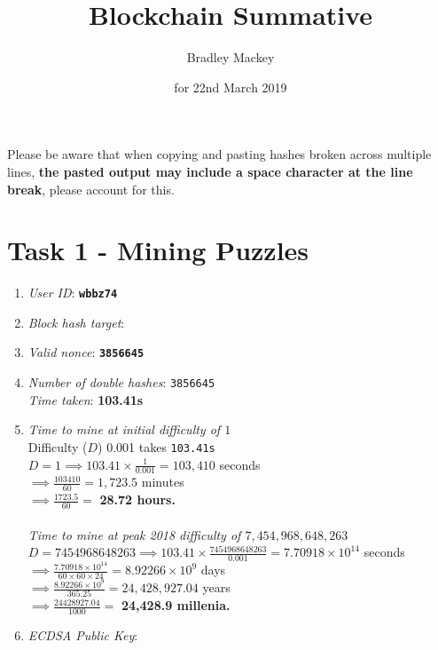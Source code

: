 \documentclass[11pt]{article}
\begin{document}
\title{\textbf{Blockchain Summative}}
\date{for 22nd March 2019}
\author{Bradley Mackey}
\maketitle

Please be aware that when copying and pasting hashes broken across multiple lines, \textbf{the pasted output may include a space character at the line break}, please account for this.


\section*{Task 1 - Mining Puzzles}

\begin{enumerate}
\item \textit{User ID}: \textbf{\texttt{wbbz74}}
\item \textit{Block hash target}: \texttt{}
\item \textit{Valid nonce}: \textbf{\texttt{3856645}}
\item \textit{Number of double hashes}: \texttt{3856645}\\\textit{Time taken}: \textbf{103.41s}
\item 
\textit{Time to mine at initial difficulty of $1$}\\
Difficulty ($D$) 0.001 takes \texttt{103.41s}\\
$D=1 \implies 103.41\times{\frac{1}{0.001}}=103,410$ seconds\\
$\implies \frac{103410}{60}=1,723.5$ minutes\\
$\implies \frac{1723.5}{60}=$ \textbf{28.72 hours.}\\
\\
\textit{Time to mine at peak 2018 difficulty of $7,454,968,648,263$}\\
$D=7454968648263 \implies 103.41\times{\frac{7454968648263}{0.001}}=7.70918\times10^{14}$ seconds\\
$\implies \frac{7.70918\times10^{14}}{60\times60\times24}=8.92266\times10^{9}$ days\\
$\implies \frac{8.92266\times10^{9}}{365.25}=24,428,927.04$ years\\
$\implies \frac{24428927.04}{1000}=$ \textbf{24,428.9 millenia.}\\

\item \textit{ECDSA Public Key}: \texttt{}


\end{enumerate}
\end{document}
